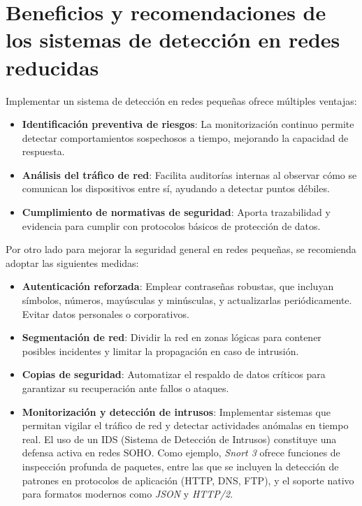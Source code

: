 \documentclass[11pt,a4paper,twoside]{report}
\begin{document}

\section{Beneficios y recomendaciones de los sistemas de detección en redes reducidas}

Implementar un sistema de detección en redes pequeñas ofrece múltiples ventajas:

\begin{itemize}
	\item \textbf{Identificación preventiva de riesgos}: La monitorización continuo permite detectar comportamientos sospechosos a tiempo, mejorando la capacidad de respuesta.
	\item \textbf{Análisis del tráfico de red}: Facilita auditorías internas al observar cómo se comunican los dispositivos entre sí, ayudando a detectar puntos débiles.
	\item \textbf{Cumplimiento de normativas de seguridad}: Aporta trazabilidad y evidencia para cumplir con protocolos básicos de protección de datos.
\end{itemize}


Por otro lado para mejorar la seguridad general en redes pequeñas, se recomienda adoptar las siguientes medidas:

\begin{itemize}[itemsep=6pt]
	\item \textbf{Autenticación reforzada}: Emplear contraseñas robustas, que incluyan símbolos, números, mayúsculas y minúsculas, y actualizarlas periódicamente. Evitar datos personales o corporativos.
	
	\item \textbf{Segmentación de red}: Dividir la red en zonas lógicas para contener posibles incidentes y limitar la propagación en caso de intrusión.
	
	\item \textbf{Copias de seguridad}: Automatizar el respaldo de datos críticos para garantizar su recuperación ante fallos o ataques.
	
	\item \textbf{Monitorización y detección de intrusos}: Implementar sistemas que permitan vigilar el tráfico de red y detectar actividades anómalas en tiempo real. El uso de un IDS (Sistema de Detección de Intrusos) constituye una defensa activa en redes SOHO. Como ejemplo, \textit{Snort 3} ofrece funciones de inspección profunda de paquetes, entre las que se incluyen la detección de patrones en protocolos de aplicación (HTTP, DNS, FTP), y el soporte nativo para formatos modernos como \textit{JSON} y \textit{HTTP/2}.
\end{itemize}
\end{document}
